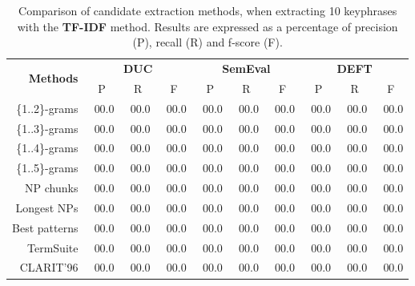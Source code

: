     \begin{table}[h]
      \centering
      \begin{tabular}{rccccccccc}
        \toprule
        \multirow{2}{*}[-2pt]{\textbf{Methods}} & \multicolumn{3}{c}{\textbf{DUC}} & \multicolumn{3}{c}{\textbf{SemEval}} & \multicolumn{3}{c}{\textbf{DEFT}}\\
        \cmidrule(r){2-4}\cmidrule(lr){5-7}\cmidrule(l){8-10}
        & P & R & F & P & R & F & P & R & F\\
        \midrule
        \{1..2\}-grams & ${~~}$00.0 & ${~~}$00.0 & ${~~}$00.0 & ${~~}$00.0 & ${~~}$00.0 & ${~~}$00.0 & ${~~}$00.0 & ${~~}$00.0 & ${~~}$00.0\\
        \{1..3\}-grams & ${~~}$00.0 & ${~~}$00.0 & ${~~}$00.0 & ${~~}$00.0 & ${~~}$00.0 & ${~~}$00.0 & ${~~}$00.0 & ${~~}$00.0 & ${~~}$00.0\\
        \{1..4\}-grams & ${~~}$00.0 & ${~~}$00.0 & ${~~}$00.0 & ${~~}$00.0 & ${~~}$00.0 & ${~~}$00.0 & ${~~}$00.0 & ${~~}$00.0 & ${~~}$00.0\\
        \{1..5\}-grams & ${~~}$00.0 & ${~~}$00.0 & ${~~}$00.0 & ${~~}$00.0 & ${~~}$00.0 & ${~~}$00.0 & ${~~}$00.0 & ${~~}$00.0 & ${~~}$00.0\\
        NP chunks & ${~~}$00.0 & ${~~}$00.0 & ${~~}$00.0 & ${~~}$00.0 & ${~~}$00.0 & ${~~}$00.0 & ${~~}$00.0 & ${~~}$00.0 & ${~~}$00.0\\
        Longest NPs & ${~~}$00.0 & ${~~}$00.0 & ${~~}$00.0 & ${~~}$00.0 & ${~~}$00.0 & ${~~}$00.0 & ${~~}$00.0 & ${~~}$00.0 & ${~~}$00.0\\
        Best patterns & ${~~}$00.0 & ${~~}$00.0 & ${~~}$00.0 & ${~~}$00.0 & ${~~}$00.0 & ${~~}$00.0 & ${~~}$00.0 & ${~~}$00.0 & ${~~}$00.0\\
        TermSuite & ${~~}$00.0 & ${~~}$00.0 & ${~~}$00.0 & ${~~}$00.0 & ${~~}$00.0 & ${~~}$00.0 & ${~~}$00.0 & ${~~}$00.0 & ${~~}$00.0\\
        CLARIT'96 & ${~~}$00.0 & ${~~}$00.0 & ${~~}$00.0 & ${~~}$00.0 & ${~~}$00.0 & ${~~}$00.0 & ${~~}$00.0 & ${~~}$00.0 & ${~~}$00.0\\
        \bottomrule
      \end{tabular}
      \caption{Comparison of candidate extraction methods, when extracting 10
               keyphrases with the \textbf{TF-IDF} method. Results are expressed
               as a percentage of precision (P), recall (R) and f-score (F).
               \label{tab:keyphrase_extraction_results}}
    \end{table}

